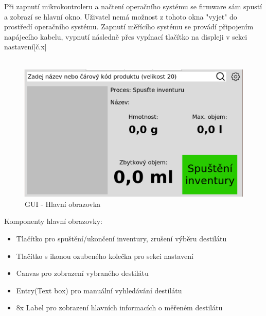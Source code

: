 Při zapnutí mikrokontroleru a načtení operačního systému se firmware sám spustí a zobrazí se hlavní okno. Uživatel nemá možnost z tohoto okna "vyjet" do prostředí operačního systému. Zapnutí měřícího systému se provádí připojením napájecího kabelu, vypnutí následně přes vypínací tlačítko na displeji v sekci nastavení[č.x]
\\\\

\begin{figure}[!h]
    \begin{center}
        \includegraphics[scale=0.9]{obrazky/GUI.PNG}
    \end{center}
    \caption{GUI - Hlavní obrazovka}
    \label{putty}
\end{figure}

Komponenty hlavní obrazovky:
\begin{itemize}
    \item Tlačítko pro spuštění/ukončení inventury, zrušení výběru destilátu
    \item Tlačítko s ikonou ozubeného kolečka pro sekci nastavení
    \item Canvas pro zobrazení vybraného destilátu
    \item Entry(Text box) pro manuální vyhledávání destilátu
    \item 8x Label pro zobrazení hlavních informacích o měřeném destilátu
\end{itemize}


